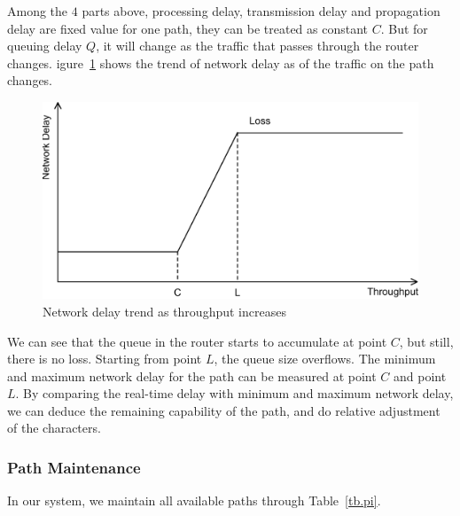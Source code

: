 Among the $4$ parts above, processing delay, transmission delay and propagation delay are fixed value for one path, they can be treated as constant $C$. But for queuing delay $Q$, it will change as the traffic that passes through the router changes. igure~\ref{fig.delay} shows the trend of network delay as of the traffic on the path changes.

\begin{figure}
\centering
\includegraphics[width=0.8\linewidth]{fig/delay.eps}
\caption{Network delay trend as throughput increases}
\label{fig.delay}
\end{figure}

We can see that the queue in the router starts to accumulate at point $C$, but still, there is no loss. Starting from point $L$, the queue size overflows. The minimum and maximum network delay for the path can be measured at point $C$ and point $L$. By comparing the real-time delay with minimum and maximum network delay, we can deduce the remaining capability of the path, and do relative adjustment of the characters.


\subsubsection{Path Maintenance}

In our system, we maintain all available paths through Table~\ref{tb.pi}.

